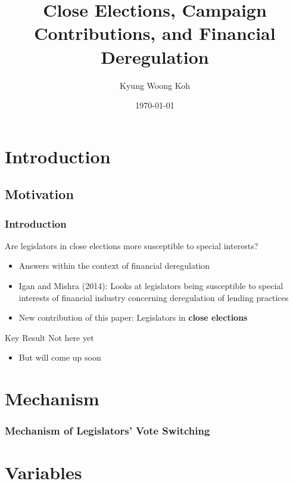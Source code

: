 \documentclass[pdflatex]{beamer}
\title[Close Elections]{Close Elections, Campaign Contributions, and Financial Deregulation}
\author[Koh]{Kyung Woong Koh}
\institute[JHU]{Johns Hopkins University}
\date[\today]{\today}
\begin{document}


\begin{frame}[plain]
  \titlepage
\end{frame}


\section{Introduction}
\subsection{Motivation}


\begin{frame}
\frametitle{Introduction}

Are legislators in close elections more susceptible to special interests?
\begin{itemize}
	\item Answers within the context of financial deregulation
	\item Igan and Mishra (2014): Looks at legislators being susceptible to special interests of financial industry concerning deregulation of lending practices
	\item New contribution of this paper: Legislators in \textbf{close elections}
\end{itemize}
\end{frame}


\begin{frame}{Key Result}
Not here yet
\begin{itemize}
\item But will come up soon
\end{itemize}

\end{frame}


\section{Mechanism}
\begin{frame}
\frametitle{Mechanism of Legislators' Vote Switching}



\end{frame}


\section{Variables}
\end{document}
